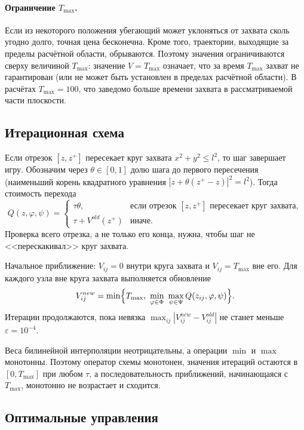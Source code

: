 \documentclass[14pt,a4paper]{extarticle}
\begin{document}
	\paragraph{Ограничение $T_{\max}$.} Если из некоторого положения убегающий может уклоняться от захвата сколь угодно долго, точная цена бесконечна. Кроме того, траектории, выходящие за пределы расчётной области, обрываются. Поэтому значения ограничиваются сверху величиной $T_{\max}$: значение $V=T_{\max}$ означает, что за время $T_{\max}$ захват не гарантирован (или не может быть установлен в пределах расчётной области). В расчётах $T_{\max}=100$, что заведомо больше времени захвата в рассматриваемой части плоскости.

	\subsection{Итерационная схема}

	Если отрезок $[z,z^{+}]$ пересекает круг захвата $x^2+y^2\le l^2$, то шаг завершает игру. Обозначим через $\theta\in[0,1]$ долю шага до первого пересечения (наименьший корень квадратного уравнения $|z+\theta(z^{+}-z)|^2=l^2$). Тогда стоимость перехода
	\[
	Q(z,\varphi,\psi)=
	\begin{cases}
		\tau\theta, & \text{если отрезок } [z,z^{+}] \text{ пересекает круг захвата},\\
		\tau+V^{old}(z^{+}) & \text{иначе}.
	\end{cases}
	\]
	Проверка всего отрезка, а не только его конца, нужна, чтобы шаг не <<перескакивал>> круг захвата.

	Начальное приближение: $V_{ij}=0$ внутри круга захвата и $V_{ij}=T_{\max}$ вне его. Для каждого узла вне круга захвата выполняется обновление
	\[
	V^{new}_{ij}=\min\Bigl\{T_{\max},\ \min_{\varphi\in\Phi}\ \max_{\psi\in\Psi} Q(z_{ij},\varphi,\psi)\Bigr\}.
	\]
	Итерации продолжаются, пока невязка $\max_{ij}|V^{new}_{ij}-V^{old}_{ij}|$ не станет меньше $\varepsilon=10^{-4}$.

	Веса билинейной интерполяции неотрицательны, а операции $\min$ и $\max$ монотонны. Поэтому оператор схемы монотонен, значения итераций остаются в $[0,T_{\max}]$ при любом $\tau$, а последовательность приближений, начинающаяся с $T_{\max}$, монотонно не возрастает и сходится.

	\subsection{Оптимальные управления}
\end{document}
